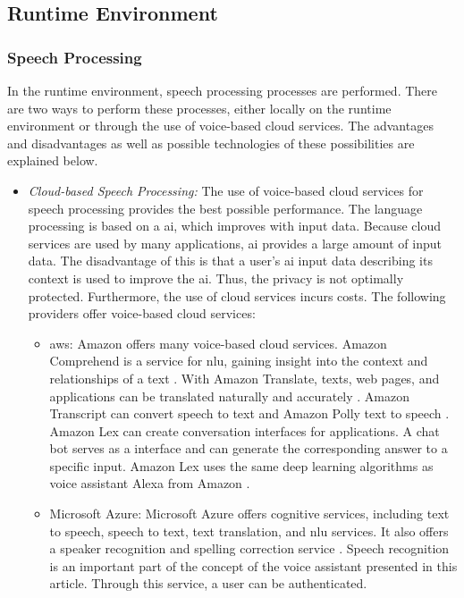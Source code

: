 \subsection{Runtime Environment}
\subsubsection{Speech Processing}
In the runtime environment, speech processing processes are performed. There are two ways to perform these processes, either locally on the runtime environment or through the use of voice-based cloud services. The advantages and disadvantages as well as possible technologies of these possibilities are explained below.
\begin{itemize}
	\item \textsl{Cloud-based Speech Processing:} The use of voice-based cloud services for speech processing provides the best possible performance. The language processing is based on a \ac{ai}, which improves with input data. Because cloud services are used by many applications, \ac{ai} provides a large amount of input data. The disadvantage of this is that a user's \ac{ai} input data describing its context is used to improve the \ac{ai}. Thus, the privacy is not optimally protected. Furthermore, the use of cloud services incurs costs. The following providers offer voice-based cloud services:
	\begin{itemize}
		\item \ac{aws}: Amazon offers many voice-based cloud services. Amazon Comprehend is a service for \ac{nlu}, gaining insight into the context and relationships of a text \cite{AmazonComprehed}. With Amazon Translate, texts, web pages, and applications can be translated naturally and accurately \cite{AmazonTranslate}. Amazon Transcript can convert speech to text and Amazon Polly text to speech \cite{AmazonTranscript} \cite {AmazonPolly}. Amazon Lex can create conversation interfaces for applications. A chat bot serves as a  interface and can generate the corresponding answer to a specific input. Amazon Lex uses the same deep learning algorithms as voice assistant Alexa from Amazon \cite{AmazonLex}.
		\item Microsoft Azure: Microsoft Azure offers cognitive services, including text to speech, speech to text, text translation, and \ac{nlu} services. It also offers a speaker recognition and spelling correction service \cite{MicrosoftAzureCognitiveServices}. Speech recognition is an important part of the concept of the voice assistant presented in this article. Through this service, a user can be authenticated.

\end{itemize}
\end{itemize}

